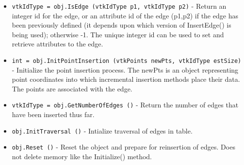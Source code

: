 \begin{itemize}
\item  \verb|vtkIdType = obj.IsEdge (vtkIdType p1, vtkIdType p2)| -  Return an integer id for the edge, or an attribute id of the edge
 (p1,p2) if the edge has been previously defined (it depends upon
 which version of InsertEdge() is being used); otherwise -1. The
 unique integer id can be used to set and retrieve attributes to
 the edge.

\item  \verb|int = obj.InitPointInsertion (vtkPoints newPts, vtkIdType estSize)| -  Initialize the point insertion process. The newPts is an object
 representing point coordinates into which incremental insertion methods
 place their data. The points are associated with the edge.

\item  \verb|vtkIdType = obj.GetNumberOfEdges ()| -  Return the number of edges that have been inserted thus far.

\item  \verb|obj.InitTraversal ()| -  Intialize traversal of edges in table.

\item  \verb|obj.Reset ()| -  Reset the object and prepare for reinsertion of edges. Does not delete
 memory like the Initialize() method.

\end{itemize}
